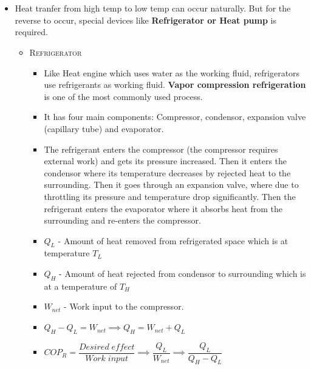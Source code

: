 \documentclass[8pt]{article}
\begin{document}
			\hrulefill\\
\\
			\begin{itemize}[wide]
				\item Heat tranfer from high temp to low temp can occur naturally. But for the reverse to occur, special devices like \textbf{Refrigerator or Heat pump} is required.
				\begin{itemize}
					\item \textsc{Refrigerator}
						\begin{itemize}[wide]
							\item Like Heat engine which uses water as the working fluid, refrigerators use refrigerants as working fluid. \textbf{Vapor compression refrigeration} is one of the most commonly used process. 
							\item It has four main components: Compressor, condensor, expansion valve (capillary tube) and evaporator. 
							\item The refrigerant enters the compressor (the compressor requires external work) and gets its pressure increased. Then it enters the condensor where its temperature decreases by rejected heat to the surrounding. Then it goes through an expansion valve, where due to throttling its pressure and temperature drop significantly. Then the refrigerant enters the evaporator where it absorbs heat from the surrounding and re-enters the compressor.
							\item $Q_L$ - Amount of heat removed from refrigerated space which is at temperature $T_L$
							\item $Q_H$ - Amount of heat rejected from condensor to surrounding which is at a temperature of $T_H$
							\item $W_{net}$ - Work input to the compressor. 
							\item $Q_H - Q_L = W_{net} \implies \boxed{Q_H = W_{net} + Q_L}$
							\item $\boxed{COP_R = \dfrac{Desired\;effect}{Work\;input} \implies \dfrac{Q_L}{W_{net}} \implies \dfrac{Q_L}{Q_H-Q_L}}$\\
						\end{itemize}
					

\end{itemize}
\end{itemize}
\end{document}
